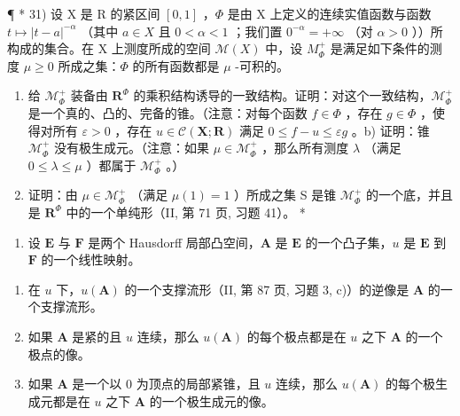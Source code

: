 ¶ * 31) 设 X 是 R 的紧区间 \([0, 1]\) ，\(\Phi\) 是由 X 上定义的连续实值函数与函数 \(t \mapsto |t - a|^{-\alpha}\) （其中 \(a \in X\) 且 \(0 < \alpha < 1\) ；我们置 \(0^{-\alpha} = +\infty\) （对 \(\alpha > 0\) ））所构成的集合。在 X 上测度所成的空间 \(\mathcal{M}(X)\) 中，设 \(M_{\Phi}^{+}\) 是满足如下条件的测度 \(\mu \geqslant 0\) 所成之集：\(\Phi\) 的所有函数都是 \(\mu\) -可积的。

\begin{enumerate}
\def\labelenumi{\alph{enumi})}
\item
  给 \(\mathcal{M}_{\Phi}^{+}\) 装备由 \(\mathbf{R}^{\Phi}\) 的乘积结构诱导的一致结构。证明：对这个一致结构，\(\mathcal{M}_{\Phi}^{+}\) 是一个真的、凸的、完备的锥。（注意：对每个函数 \(f \in \Phi\) ，存在 \(g \in \Phi\) ，使得对所有 \(\varepsilon > 0\) ，存在 \(u \in \mathcal{C}(\mathbf{X}; \mathbf{R})\) 满足 \(0 \leqslant f - u \leqslant \varepsilon g\) 。b) 证明：锥 \(\mathcal{M}_{\Phi}^{+}\) 没有极生成元。（注意：如果 \(\mu \in \mathcal{M}_{\Phi}^{+}\) ，那么所有测度 \(\lambda\) （满足 \(0 \leqslant \lambda \leqslant \mu\) ）都属于 \(\mathcal{M}_{\Phi}^{+}\) 。）
\item
  证明：由 \(\mu \in \mathcal{M}_{\Phi}^{+}\) （满足 \(\mu(1) = 1\) ）所成之集 S 是锥 \(\mathcal{M}_{\Phi}^{+}\) 的一个底，并且是 \(\mathbf{R}^{\Phi}\) 中的一个单纯形（II, 第 71 页, 习题 41）。 *
\end{enumerate}

\begin{enumerate}
\def\labelenumi{\arabic{enumi})}
\setcounter{enumi}{31}
\tightlist
\item
  设 \(\mathbf{E}\) 与 \(\mathbf{F}\) 是两个 Hausdorff 局部凸空间，\(\mathbf{A}\) 是 \(\mathbf{E}\) 的一个凸子集，\(u\) 是 \(\mathbf{E}\) 到 \(\mathbf{F}\) 的一个线性映射。
\end{enumerate}

\begin{enumerate}
\def\labelenumi{\alph{enumi})}
\item
  在 \(u\) 下，\(u(\mathbf{A})\) 的一个支撑流形（II, 第 87 页, 习题 3, c)）的逆像是 \(\mathbf{A}\) 的一个支撑流形。
\item
  如果 \(\mathbf{A}\) 是紧的且 \(u\) 连续，那么 \(u(\mathbf{A})\) 的每个极点都是在 \(u\) 之下 \(\mathbf{A}\) 的一个极点的像。
\item
  如果 \(\mathbf{A}\) 是一个以 0 为顶点的局部紧锥，且 \(u\) 连续，那么 \(u(\mathbf{A})\) 的每个极生成元都是在 \(u\) 之下 \(\mathbf{A}\) 的一个极生成元的像。
\end{enumerate}

